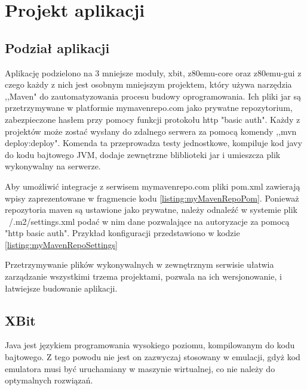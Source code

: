 \chapter{Projekt aplikacji}
	
	\section{Podział aplikacji}
	Aplikację podzielono na 3 mniejsze moduły, xbit, z80emu-core oraz z80emu-gui z czego każdy z nich jest osobnym mniejszym projektem, który używa narzędzia ,,Maven" do zautomatyzowania procesu budowy oprogramowania. Ich pliki jar są przetrzymywane w platformie mymavenrepo.com jako prywatne repozytorium, zabezpieczone hasłem przy pomocy funkcji protokołu http "basic auth". Każdy z projektów może zostać wysłany do zdalnego serwera za pomocą komendy ,,mvn deploy:deploy". Komenda ta przeprowadza testy jednostkowe, kompiluje kod javy do kodu bajtowego JVM, dodaje zewnętrzne bliblioteki jar i umieszcza plik wykonywalny na serwerze.
	
	Aby umożliwić integracje z serwisem mymavenrepo.com pliki pom.xml zawierają wpisy zaprezentowane w fragmencie kodu \ref{listing:myMavenRepoPom}. Ponieważ repozytoria maven są ustawione jako prywatne, należy odnaleźć w systemie plik ~/.m2/settings.xml podać w nim dane pozwalające na autoryzacje za pomocą "http basic auth". Przykład konfiguracji przedstawiono w kodzie \ref{listing:myMavenRepoSettings}
	
	
	
	
	
	Przetrzymywanie plików wykonywalnych w zewnętrznym serwisie ułatwia zarządzanie wszystkimi trzema projektami, pozwala na ich wersjonowanie, i łatwiejsze budowanie aplikacji. 

	\section{XBit}
	Java jest językiem programowania wysokiego poziomu, kompilowanym do kodu bajtowego. Z tego powodu nie jest on zazwyczaj stosowany w emulacji, gdyż kod emulatora musi być uruchamiany w maszynie wirtualnej, co nie należy do optymalnych rozwiązań.
	
